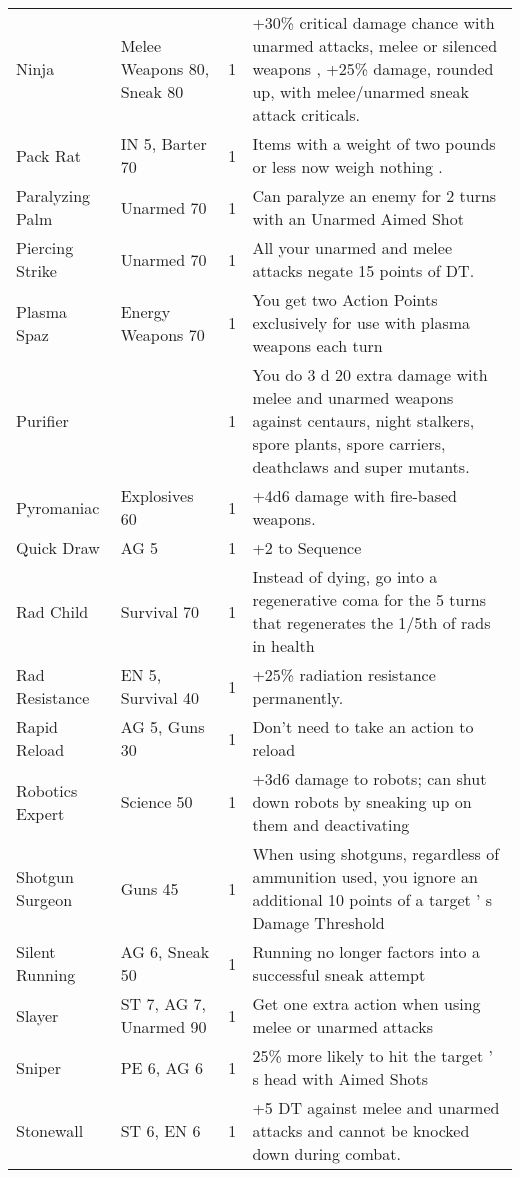 \documentclass{report}
\begin{document}
\begin{table}[H]
\begin{tabular}{p{30mm}p{30mm}p{30mm}p{30mm}}
Ninja  & Melee Weapons 80, Sneak 80  & 1  & +30\% critical damage chance with unarmed attacks, melee or silenced weapons , +25\% damage,  rounded up,  with melee/unarmed sneak attack criticals.  \\
Pack Rat  & IN 5, Barter 70  & 1  & Items with a weight of two pounds or less now weigh  nothing .  \\
Paralyzing Palm  & Unarmed 70  & 1  & Can paralyze an enemy for  2 turns  with  an Unarmed Aimed Shot \\
Piercing Strike  & Unarmed 70  & 1  & All your unarmed and melee attacks negate 15 points of DT.  \\
Plasma Spaz  & Energy Weapons 70  & 1  & You get  two Action Points exclusively for use with  plasma weapons  each turn \\
Purifier  &  & 1  & You do  3 d 20  extra damage with melee and unarmed weapons against centaurs, night stalkers, spore plants, spore carriers, deathclaws and super mutants.  \\
Pyromaniac  & Explosives 60  & 1  & +4d6  damage with fire-based weapons.  \\
Quick Draw  & AG 5  & 1  & +2 to Sequence \\
Rad Child  & Survival 70  & 1  & Instead of dying, go into a regenerative coma for the 5 turns that regenerates the 1/5th of rads in  health \\
Rad Resistance  & EN 5, Survival 40  & 1  & +25\% radiation resistance permanently.  \\
Rapid Reload  & AG 5, Guns 30  & 1  & Don’t need to take an action to reload \\
Robotics Expert  & Science 50  & 1  & +3d6  damage to robots; can shut down robots by sneaking up on them and deactivating \\
Shotgun Surgeon  & Guns 45  & 1  & When using shotguns, regardless of ammunition used, you ignore an additional 10 points of a target ' s Damage Threshold \\
Silent Running  & AG 6, Sneak 50  & 1  & Running no longer factors into a successful sneak attempt  \\
Slayer  & ST 7, AG 7, Unarmed 90  & 1  & Get one extra action when using melee or unarmed attacks \\
Sniper  & PE 6, AG 6  & 1  & 25\% more likely to hit the target ' s head  with Aimed Shots \\
Stonewall  & ST 6, EN 6  & 1  & +5 DT against melee and unarmed attacks and cannot be knocked down during combat.  \\

\end{tabular}
\end{table}
\end{document}
